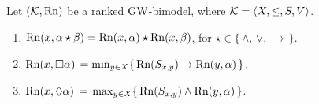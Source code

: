 \begin{lemma}\label{lemma:Rn}
  Let $(\mathcal{K},\mathrm{Rn})$ be a ranked   $\mbox{$\mathrm{GW}$}$-bimodel, where $\mathcal{K}=\langle X,\leq,S,V \rangle$.
  \begin{enumerate}[label=(\roman*), ref=(\roman*),leftmargin=*]
  \item\label{lemma:Rn:prop}
    $\mathrm{Rn}(x,\alpha\star \beta)   = \mathrm{Rn}(x,\alpha) \star \mathrm{Rn}(x,\beta)$,   for $\star\in \{\,\land,\,\lor,\,\to\,\}$.
    
  \item\label{lemma:Rn:box}
 $\mathrm{Rn}(x,\Box\alpha)\,=\min_{y\in X}\{\,\mathrm{Rn}(S_{x,y})\to \mathrm{Rn}(y,\alpha) \,\}$.
    
  \item\label{lemma:Rn:diam}
    $\mathrm{Rn}(x,\lozenge\alpha)\,=\,\max_{y\in X}\{\, \mathrm{Rn}(S_{x,y}) \land \mathrm{Rn}(y,\alpha)\,\}$.
  \end{enumerate}
\end{lemma}
